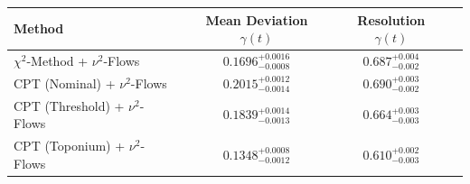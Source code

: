     \begin{tabular}{lccc}
        \toprule
        Method & Mean Deviation $\gamma(t)$ & Resolution $\gamma(t)$ \\
        \midrule
        $\chi^2$-Method + $\nu^2$-Flows & $0.1696^{+0.0016}_{-0.0008}$ & $0.687^{+0.004}_{-0.002}$ \\
        CPT (Nominal) + $\nu^2$-Flows & $0.2015^{+0.0012}_{-0.0014}$ & $0.690^{+0.003}_{-0.002}$ \\
        CPT (Threshold) + $\nu^2$-Flows & $0.1839^{+0.0014}_{-0.0013}$ & $0.664^{+0.003}_{-0.003}$ \\
        CPT (Toponium) + $\nu^2$-Flows & $0.1348^{+0.0008}_{-0.0012}$ & $0.610^{+0.002}_{-0.003}$ \\
        \bottomrule
    \end{tabular}